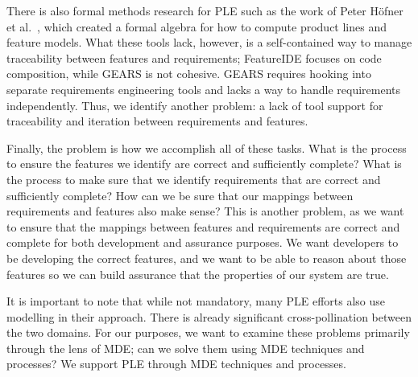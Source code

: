 There is also formal methods research for \gls{PLE} such as the work of Peter H\"{o}fner et al.~\cite{hofner2006feature,hofner2011algebra}, which created a formal algebra for how to compute product lines and feature models. What these tools lack, however, is a self-contained way to manage traceability between features and requirements; FeatureIDE focuses on code composition, while GEARS is not cohesive. GEARS requires hooking into separate requirements engineering tools and lacks a way to handle requirements independently. Thus, we identify another problem: a lack of tool support for traceability and iteration between requirements and features.

Finally, the problem is how we accomplish all of these tasks. What is the process to ensure the features we identify are correct and sufficiently complete? What is the process to make sure that we identify requirements that are correct and sufficiently complete? How can we be sure that our mappings between requirements and features also make sense? This is another problem, as we want to ensure that the mappings between features and requirements are correct and complete for both development and assurance purposes. We want developers to be developing the correct features, and we want to be able to reason about those features so we can build assurance that the properties of our system are true.


It is important to note that while not mandatory, many \gls{PLE} efforts also use modelling in their approach. There is already significant cross-pollination between the two domains. For our purposes, we want to examine these problems primarily through the lens of \gls{MDE}; can we solve them using \gls{MDE} techniques and processes? We support \gls{PLE} through \gls{MDE} techniques and processes.

